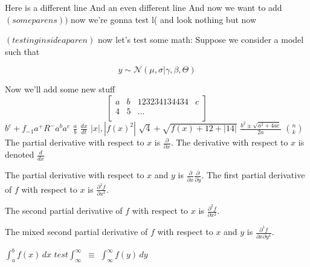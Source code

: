 \documentclass{article}
\newcommand{\abs}[1]{\left|#1\right|}
\newcommand{\dvOne}[1]{\frac{d}{d #1}}
\newcommand{\pdivOne}[1]{\frac{\partial}{\partial #1}}
\newcommand{\pdivN}[3]{\frac{\partial^{#3} #1}{\partial #2^{#3}}}
\begin{document}
    Here is a different line
    And an even different line
    And now we want to add $\left(some parens\right))$
    now we're gonna test l( and look nothing but now

    $ \left(testing inside a paren\right)$
    now let's test some math:
    Suppose we consider a model such that

    \begin{equation*}
        y \sim \mathcal{N}(\mu, \sigma \vert \gamma, \beta, \Theta)
    \end{equation*}


    Now we'll add some new stuff 
    \begin{equation*}
        \begin{bmatrix}
            a &    b & 123234134434 & c \\
            4   &    5     &     \dots \\
        \end{bmatrix}
    \end{equation*}
    $b^{c} + f_{-1} a^{+}  R^{-}  a^{b} a^{c}$
    $ \frac{a}{b}$
    $ \frac{dx}{dt}$
    $\abs{x}, \abs{f(x)^{2}}$
    $\sqrt{4} + \sqrt{f(x) + 12 + \abs{14}}$
    $\frac{b^{2} \pm \sqrt{a^{2} + 4ac}}{2a}$
    $\binom{n}{k}$
    The partial derivative with respect to \( x \) is \(\pdivOne{x}\).
    The derivative with respect to $x$ is denoted $\dvOne{x}$

The partial derivative with respect to \( x \) and \( y \) is \(\pdivOne{x} \pdivOne{y}\).
The first partial derivative of \( f \) with respect to \( x \) is \(\pdivN{f}{x}{1}\).

The second partial derivative of \( f \) with respect to \( x \) is \(\pdivN{f}{x}{2}\).

The mixed second partial derivative of \( f \) with respect to \( x \) and \( y \) is \(\pdivN{f}{x \partial y}{1}\).

 $\int_{a}^{b} f(x) \,dx$
 $test \int_{\infty}^{\infty}$
 $\equiv $
 $\int_{\infty}^{\infty} f(y) \,dy$
\end{document}
